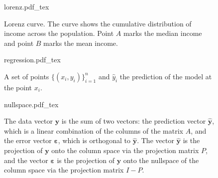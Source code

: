 \documentclass[10pt]{article}
\newcommand{\incfig}[3][1]{%
    \def\svgwidth{#1\columnwidth}
    {#3.pdf_tex}
}
\begin{document}
\begin{figure}[ht]
    \centering
    \incfig[0.75]{figures/lorenz/}{lorenz}
    \caption{
        Lorenz curve. The curve shows the cumulative distribution of income
        across the population. Point $A$ marks the median income and point $B$
        marks the mean income.
    }
    \label{fig:lorenz}
\end{figure}


\begin{figure}[ht]
    \centering
    \incfig[0.7]{figures/regression/}{regression}
    \caption{
        A set of points $\{(x_i, y_i)\}_{i=1}^n$ and $\hat{y}_i$ the prediction of the model at the point $x_i$.
        }
    \label{fig:regression}
\end{figure}


\begin{figure}[ht]
    \centering
    \incfig[0.7]{figures/nullspace/}{nullspace}
    \caption{
        The data vector $\bm{y}$ is the sum of two vectors:
        the prediction vector $\hat{\bm{y}}$, which is a linear
        combination of the columns of the matrix $A$,
        and the error vector $\bm{\varepsilon}$, which is orthogonal to $\hat{\bm{y}}$.
        The vector $\hat{\bm{y}}$ is the projection of $\bm{y}$ onto the column space via
        the projection matrix $P$, and the vector $\bm{\varepsilon}$ is the projection
        of $\bm{y}$ onto the nullspace of the column space via the projection matrix $I-P$.
        }
    \label{fig:nullspace}
\end{figure}
\end{document}
